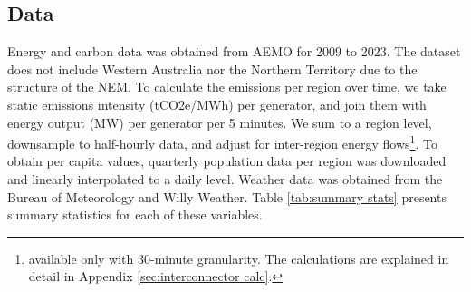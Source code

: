 \subsection{Data}
\label{sec:data}

Energy and carbon data was obtained from \ac{AEMO}\nocite{nemweb, nemweb_mmsdm} for 2009 to 2023. 
The dataset does not include Western Australia nor the Northern Territory due to the structure of the \ac{NEM}.
To calculate the emissions per region over time, we take static emissions intensity (tCO2e/MWh) per generator, and join them with energy output (MW) per generator per 5 minutes. We sum to a region level, downsample to half-hourly data, and adjust for inter-region energy flows\footnote{available only with 30-minute granularity. The calculations are explained in detail in Appendix \ref{sec:interconnector calc}.}.
To obtain per capita values, 
quarterly population data per region was downloaded \parencite{abs_population} and linearly interpolated to a daily level.
Weather data was obtained from the Bureau of Meteorology\nocite{weather_data} and Willy Weather\nocite{willy_weather}. Table \ref{tab:summary stats} presents summary statistics for each of these variables. 
